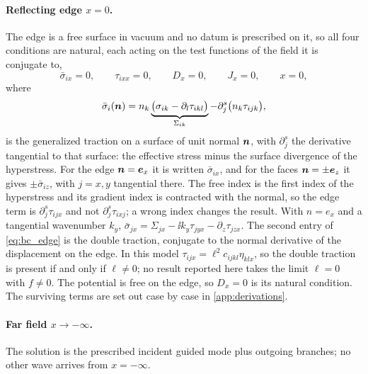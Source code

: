 \paragraph{Reflecting edge $x=0$.}  The edge is a free surface in vacuum and no datum is prescribed on it, so all four conditions are natural, each acting on the test functions of the field it is conjugate to,
\begin{equation}
\label{eq:bc_edge}
\bar\sigma_{ix}=0,\qquad \tau_{ixx}=0,\qquad D_x=0,\qquad J_x=0,\qquad x=0 ,
\end{equation}
where
\begin{equation}
\label{eq:generalised_traction}
\bar\sigma_{i}(\boldsymbol{n})=n_k\underbrace{\bigl(\sigma_{ik}-\partial_l\tau_{ikl}\bigr)}_{\Sigma_{ik}}
-\partial_j^{s}\bigl(n_k\tau_{ijk}\bigr),
\end{equation}
is the generalized traction on a surface of unit normal $\boldsymbol{n}$, with $\partial^s_j$ the derivative tangential to that surface: the effective stress minus the surface divergence of the hyperstress.  For the edge $\boldsymbol{n}=\boldsymbol{e}_x$ it is written $\bar\sigma_{ix}$, and for the faces $\boldsymbol{n}=\pm\boldsymbol{e}_z$ it gives $\pm\bar\sigma_{iz}$, with $j=x,y$ tangential there.  The free index is the first index of the hyperstress and its gradient index is contracted with the normal, so the edge term is $\partial_j^s\tau_{ijx}$ and not $\partial_j^s\tau_{ixj}$; a wrong index changes the result.  With $n=e_x$ and a tangential wavenumber $k_y$, $\bar\sigma_{jx}=\Sigma_{jx}-\ii k_y\tau_{jyx}-\partial_z\tau_{jzx}$.  The second entry of \eqref{eq:bc_edge} is the double traction, conjugate to the normal derivative of the displacement on the edge.  In this model $\tau_{ijx}=\ell^{2}c_{ijkl}\eta_{klx}$, so the double traction is present if and only if $\ell\neq0$; no result reported here takes the limit $\ell=0$ with $f\neq0$.  The potential is free on the edge, so $D_x=0$ is its natural condition.  The surviving terms are set out case by case in \cref{app:derivations}.

\paragraph{Far field $x\to-\infty$.}  The solution is the prescribed incident guided mode plus outgoing branches; no other wave arrives from $x=-\infty$.

